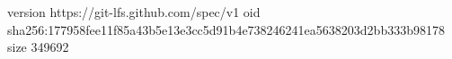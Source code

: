 version https://git-lfs.github.com/spec/v1
oid sha256:177958fee11f85a43b5e13e3cc5d91b4e738246241ea5638203d2bb333b98178
size 349692
